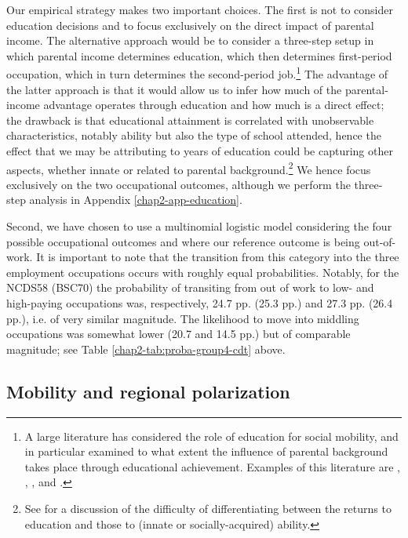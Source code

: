 Our empirical strategy makes two important choices. The first is not to consider education decisions and to focus exclusively on the direct impact of parental income. The alternative approach would be to consider a three-step setup in which parental income determines education, which then determines first-period occupation, which in turn determines the second-period job.\footnote{A large literature has considered the role of education for social mobility, and in particular examined to what extent the influence of parental background takes place through educational achievement. Examples of this literature are \cite{Blanden2004Family}, \cite{Blanden2014Education}, \cite{Blanden2016Educational}, \cite{Gregg2010Family} and \cite{Major2018Social}.} The advantage of the latter approach is that it would allow us to infer how much of the parental-income advantage operates through education and how much is a direct effect; the drawback is that educational attainment is correlated with unobservable characteristics, notably ability but also the type of school attended, hence the effect that we may be attributing to years of education could be capturing other aspects, whether innate or related to parental background.\footnote{See \cite{harmon2003returns} for a discussion of the difficulty of differentiating between the returns to education and those to (innate or socially-acquired) ability.} We hence focus exclusively on the two occupational outcomes, although we perform the three-step analysis in Appendix \ref{chap2-app-education}.

Second, we have chosen to use a multinomial logistic model considering the four possible occupational outcomes and where our reference outcome is being out-of-work. It is important to note that the transition from this category into the three employment occupations occurs with roughly equal probabilities. Notably, for the NCDS58 (BSC70) the probability of transiting from out of work to low- and high-paying occupations was, respectively, 24.7 pp. (25.3 pp.) and 27.3 pp. (26.4 pp.), i.e. of very similar magnitude. The likelihood to move into middling occupations was somewhat lower (20.7 and 14.5 pp.) but of comparable magnitude; see Table \ref{chap2-tab:proba-group4-cdt} above.

\subsection{Mobility and regional polarization}

